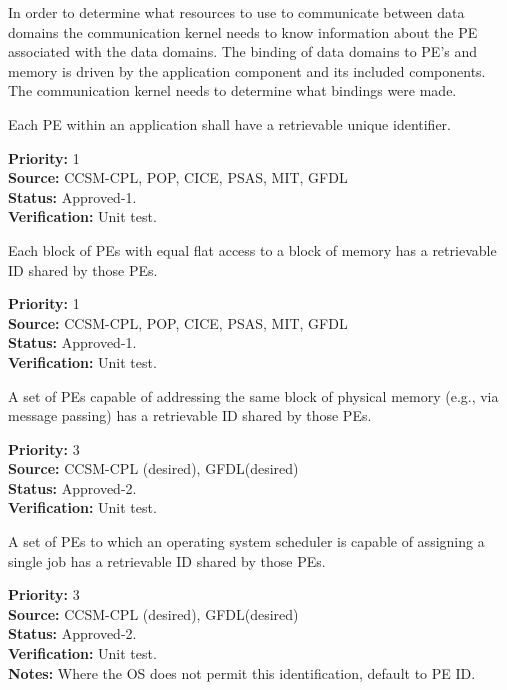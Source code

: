 In order to determine what resources to use to communicate between data domains 
the communication kernel needs to know information about the PE associated with the
data domains. The binding of data domains to PE's and memory is driven by the application
component and its included components. The communication kernel needs to determine 
what bindings were made.

Each PE within an application shall have a
retrievable unique identifier.

\begin{reqlist}
{\bf Priority:} 1 \\
{\bf Source:}  CCSM-CPL, POP, CICE, PSAS, MIT, GFDL \\
{\bf Status:} Approved-1. \\
{\bf Verification:} Unit test.
\end{reqlist}


Each block of PEs with equal flat access to a block of 
memory has a retrievable ID shared by those PEs. 

\begin{reqlist}
{\bf Priority:} 1 \\
{\bf Source:}  CCSM-CPL, POP, CICE, PSAS, MIT, GFDL \\
{\bf Status:} Approved-1. \\
{\bf Verification:} Unit test.
\end{reqlist}

A set of PEs capable of addressing the same block of physical
memory (e.g., via message passing) has a retrievable ID shared
by those PEs.

\begin{reqlist}
{\bf Priority:} 3 \\
{\bf Source:}  CCSM-CPL (desired), GFDL(desired)             \\
{\bf Status:} Approved-2. \\
{\bf Verification:} Unit test.
\end{reqlist}

A set of PEs to which an operating system scheduler is capable 
of assigning a single job has a retrievable ID shared by those
PEs.
\begin{reqlist}
{\bf Priority:} 3 \\
{\bf Source:}  CCSM-CPL (desired), GFDL(desired) \\
{\bf Status:} Approved-2. \\
{\bf Verification:} Unit test. \\
{\bf Notes:}  Where the OS does not permit this identification, default
  to PE ID.
\end{reqlist}

